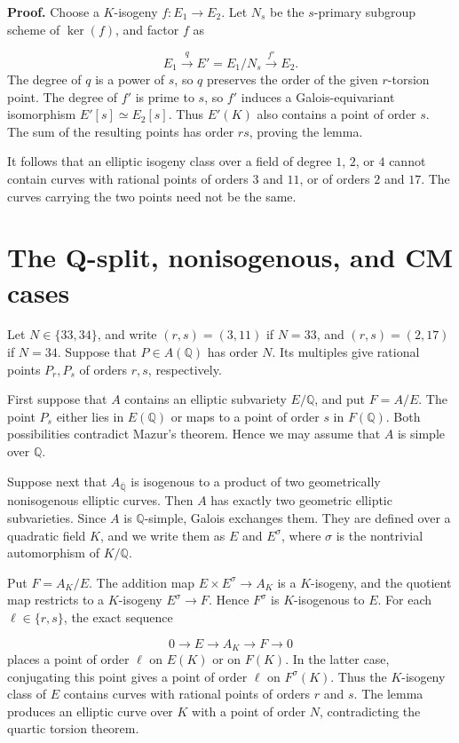 \documentclass[11pt]{article}
\newcommand{\Q}{\mathbb Q}
\begin{document}
\textbf{Proof.} Choose a \(K\)-isogeny \(f:E_1\to E_2\). Let \(N_s\) be the \(s\)-primary subgroup scheme of \(\ker(f)\), and factor \(f\) as

\[
E_1\xrightarrow{q} E'=E_1/N_s\xrightarrow{f'}E_2.
\]
The degree of \(q\) is a power of \(s\), so \(q\) preserves the order of the given \(r\)-torsion point. The degree of \(f'\) is prime to \(s\), so \(f'\) induces a Galois-equivariant isomorphism \(E'[s]\simeq E_2[s]\). Thus \(E'(K)\) also contains a point of order \(s\). The sum of the resulting points has order \(rs\), proving the lemma.

It follows that an elliptic isogeny class over a field of degree \(1\), \(2\), or \(4\) cannot contain curves with rational points of orders \(3\) and \(11\), or of orders \(2\) and \(17\). The curves carrying the two points need not be the same.


\section{The Q-split, nonisogenous, and CM cases}\label{sec:elementary-cases}
Let \(N\in\{33,34\}\), and write \((r,s)=(3,11)\) if \(N=33\), and \((r,s)=(2,17)\) if \(N=34\). Suppose that \(P\in A(\Q)\) has order \(N\). Its multiples give rational points \(P_r,P_s\) of orders \(r,s\), respectively.

First suppose that \(A\) contains an elliptic subvariety \(E/\Q\), and put \(F=A/E\). The point \(P_s\) either lies in \(E(\Q)\) or maps to a point of order \(s\) in \(F(\Q)\). Both possibilities contradict Mazur's theorem. Hence we may assume that \(A\) is simple over \(\Q\).

Suppose next that \(A_{\overline{\Q}}\) is isogenous to a product of two geometrically nonisogenous elliptic curves. Then \(A\) has exactly two geometric elliptic subvarieties. Since \(A\) is \(\Q\)-simple, Galois exchanges them. They are defined over a quadratic field \(K\), and we write them as \(E\) and \(E^\sigma\), where \(\sigma\) is the nontrivial automorphism of \(K/\Q\).

Put \(F=A_K/E\). The addition map \(E\times E^\sigma\to A_K\) is a \(K\)-isogeny, and the quotient map restricts to a \(K\)-isogeny \(E^\sigma\to F\). Hence \(F^\sigma\) is \(K\)-isogenous to \(E\). For each \(\ell\in\{r,s\}\), the exact sequence

\[
0\longrightarrow E\longrightarrow A_K\longrightarrow F\longrightarrow0
\]
places a point of order \(\ell\) on \(E(K)\) or on \(F(K)\). In the latter case, conjugating this point gives a point of order \(\ell\) on \(F^\sigma(K)\). Thus the \(K\)-isogeny class of \(E\) contains curves with rational points of orders \(r\) and \(s\). The lemma produces an elliptic curve over \(K\) with a point of order \(N\), contradicting the quartic torsion theorem.
\end{document}

